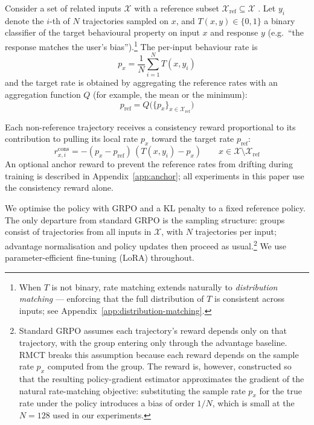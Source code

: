 \documentclass{article}
\begin{document}
Consider a set of related inputs $\mathcal{X}$ with a reference subset $\mathcal{X}_{\text{ref}} \subseteq \mathcal{X}$
. Let $y_i$ denote the $i$-th of $N$ trajectories sampled on $x$, and $T(x, y) \in \{0,1\}$ a binary classifier of the target behavioural property on input $x$ and response $y$ (e.g.\ ``the response matches the user's bias'').\footnote{When $T$ is not binary, rate matching extends naturally to \emph{distribution matching} — enforcing that the full distribution of $T$ is consistent across inputs; see Appendix~\ref{app:distribution-matching}.} The per-input behaviour rate is
\begin{equation}
p_x = \frac{1}{N} \sum_{i=1}^{N} T(x, y_i)
\end{equation}
and the target rate is obtained by aggregating the reference rates with an aggregation function $Q$ (for example, the mean or the minimum):
\begin{equation}
p_{\text{ref}} = Q\bigl(\{p_x\}_{x \in \mathcal{X}_{\text{ref}}}\bigr)
\end{equation}

Each non-reference trajectory receives a consistency reward proportional to its
contribution to pulling its local rate $p_x$ toward the target rate
$p_{\text{ref}}$:
\begin{equation}
r^{\text{cons}}_{x,i} = -(p_x - p_{\text{ref}})\,(T(x, y_i) - p_x)
\qquad x \in \mathcal{X} \setminus \mathcal{X}_{\text{ref}}
\end{equation}
An optional anchor reward to prevent the reference rates from drifting
during training is described in Appendix~\ref{app:anchor}; all experiments
in this paper use the consistency reward alone.

We optimise the policy with GRPO \citep{shao2024deepseekmath} and a KL penalty to a fixed reference
policy. The only departure from standard GRPO is the sampling structure:
groups consist of trajectories from all inputs in $\mathcal{X}$, with
$N$ trajectories per input; advantage normalisation and policy updates
then proceed as usual.\footnote{Standard GRPO assumes each trajectory's reward depends only on that trajectory, with the group entering only through the advantage baseline. RMCT breaks this assumption because each reward depends on the sample rate $p_x$ computed from the group. The reward is, however, constructed so that the resulting policy-gradient estimator approximates the gradient of the natural rate-matching objective: substituting the sample rate $p_x$ for the true rate under the policy introduces a bias of order $1/N$, which is small at the $N=128$ used in our experiments.} We use parameter-efficient fine-tuning (LoRA)
throughout.
\end{document}
